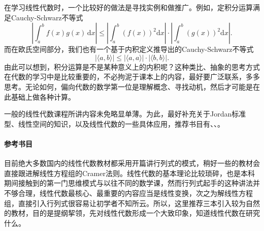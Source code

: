 在学习线性代数时，一个比较好的做法是寻找实例和做推广。例如，定积分运算满足Cauchy-Schwarz不等式
\[
    \left|\int_{a}^{b}f(x)g(x)\,\mathrm{d}x\right|\leqslant\left|\int_{a}^{b}(f(x))^2\mathrm{d}x\right|\cdot \left|\int_{a}^{b}(g(x))^2\mathrm{d}x\right|
    .\]
而在欧氏空间部分，我们也有一个基于内积定义推导出的Cauchy-Schwarz不等式
\[
    \left|\langle a,b\rangle\right|\leqslant\left|\langle a,a\rangle\right| \cdot \left|\langle b,b\rangle\right|
    .\]
由此可以想到，积分运算是不是某种意义上的内积呢？这种类比、抽象的思考方式在代数的学习中是比较重要的，不必拘泥于课本上的内容，最好要广泛联系，多多思考。无论如何，偏向代数的数学第一位是理解概念、寻找动机，然后才可能是在此基础上做各种计算。

一般的线性代数课程所讲内容未免略显单薄。为此，最好补充关于Jordan标准型、线性空间的知识，以及线性代数的一些具体应用，推荐书目有\textcite[普通高中课程标准实验教科书\ 数学\ 选修4-2\ A版\ 矩阵与变换]{矩阵与变换}、\textcite[线性代数高级教程——矩阵理论及应用]{线性代数高级教程}、\textcite[线性代数应该这样学]{阿克斯勒杜现昆2016线性代数应该这样学}。

\paragraph{参考书目}

目前绝大多数国内的线性代数教材都采用开篇讲行列式的模式，稍好一些的教材会直接跟进解线性方程组的Cramer法则。线性代数的基本理论比较琐碎，也是本科期间接触到的第一门思维模式与以往不同的数学课，然而行列式起手的这种讲法并不够合理，线性代数最核心、最重要的内容应当是线性变换，次之为解线性方程组，直接引入行列式很容易让初学者不知所云。所以，这里推荐三本引入较为自然的教材，目的是提纲挈领，先对线性代数形成一个大致印象，知道线性代数在研究什么。

